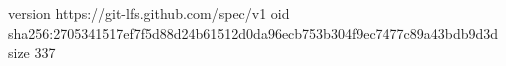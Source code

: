 version https://git-lfs.github.com/spec/v1
oid sha256:2705341517ef7f5d88d24b61512d0da96ecb753b304f9ec7477c89a43bdb9d3d
size 337
